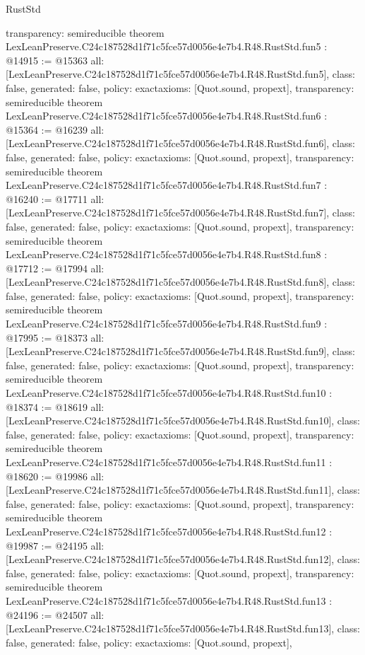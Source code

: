 \begin{lexlean}{RustStd}
\begin{coremodule}
{  transparency: semireducible
}
theorem LexLeanPreserve.C24c187528d1f71c5fce57d0056e4e7b4.R48.RustStd.fun5 : @14915 := @15363 {
  all: [LexLeanPreserve.C24c187528d1f71c5fce57d0056e4e7b4.R48.RustStd.fun5],
  class: false,
  generated: false,
  policy: exact{axioms: [Quot.sound, propext]},
  transparency: semireducible
}
theorem LexLeanPreserve.C24c187528d1f71c5fce57d0056e4e7b4.R48.RustStd.fun6 : @15364 := @16239 {
  all: [LexLeanPreserve.C24c187528d1f71c5fce57d0056e4e7b4.R48.RustStd.fun6],
  class: false,
  generated: false,
  policy: exact{axioms: [Quot.sound, propext]},
  transparency: semireducible
}
theorem LexLeanPreserve.C24c187528d1f71c5fce57d0056e4e7b4.R48.RustStd.fun7 : @16240 := @17711 {
  all: [LexLeanPreserve.C24c187528d1f71c5fce57d0056e4e7b4.R48.RustStd.fun7],
  class: false,
  generated: false,
  policy: exact{axioms: [Quot.sound, propext]},
  transparency: semireducible
}
theorem LexLeanPreserve.C24c187528d1f71c5fce57d0056e4e7b4.R48.RustStd.fun8 : @17712 := @17994 {
  all: [LexLeanPreserve.C24c187528d1f71c5fce57d0056e4e7b4.R48.RustStd.fun8],
  class: false,
  generated: false,
  policy: exact{axioms: [Quot.sound, propext]},
  transparency: semireducible
}
theorem LexLeanPreserve.C24c187528d1f71c5fce57d0056e4e7b4.R48.RustStd.fun9 : @17995 := @18373 {
  all: [LexLeanPreserve.C24c187528d1f71c5fce57d0056e4e7b4.R48.RustStd.fun9],
  class: false,
  generated: false,
  policy: exact{axioms: [Quot.sound, propext]},
  transparency: semireducible
}
theorem LexLeanPreserve.C24c187528d1f71c5fce57d0056e4e7b4.R48.RustStd.fun10 : @18374 := @18619 {
  all: [LexLeanPreserve.C24c187528d1f71c5fce57d0056e4e7b4.R48.RustStd.fun10],
  class: false,
  generated: false,
  policy: exact{axioms: [Quot.sound, propext]},
  transparency: semireducible
}
theorem LexLeanPreserve.C24c187528d1f71c5fce57d0056e4e7b4.R48.RustStd.fun11 : @18620 := @19986 {
  all: [LexLeanPreserve.C24c187528d1f71c5fce57d0056e4e7b4.R48.RustStd.fun11],
  class: false,
  generated: false,
  policy: exact{axioms: [Quot.sound, propext]},
  transparency: semireducible
}
theorem LexLeanPreserve.C24c187528d1f71c5fce57d0056e4e7b4.R48.RustStd.fun12 : @19987 := @24195 {
  all: [LexLeanPreserve.C24c187528d1f71c5fce57d0056e4e7b4.R48.RustStd.fun12],
  class: false,
  generated: false,
  policy: exact{axioms: [Quot.sound, propext]},
  transparency: semireducible
}
theorem LexLeanPreserve.C24c187528d1f71c5fce57d0056e4e7b4.R48.RustStd.fun13 : @24196 := @24507 {
  all: [LexLeanPreserve.C24c187528d1f71c5fce57d0056e4e7b4.R48.RustStd.fun13],
  class: false,
  generated: false,
  policy: exact{axioms: [Quot.sound, propext]},
}
\end{coremodule}
\end{lexlean}
